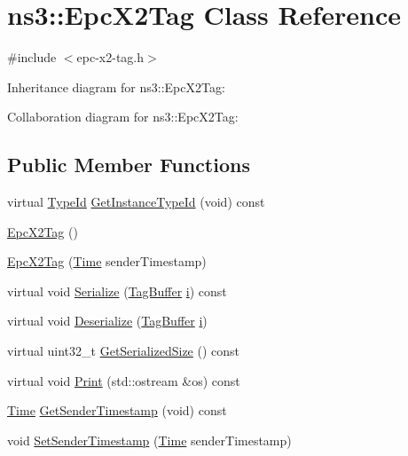 \hypertarget{classns3_1_1EpcX2Tag}{}\section{ns3\+:\+:Epc\+X2\+Tag Class Reference}
\label{classns3_1_1EpcX2Tag}


{\ttfamily \#include $<$epc-\/x2-\/tag.\+h$>$}



Inheritance diagram for ns3\+:\+:Epc\+X2\+Tag\+:


Collaboration diagram for ns3\+:\+:Epc\+X2\+Tag\+:
\subsection*{Public Member Functions}
\begin{DoxyCompactItemize}
\item 
virtual \hyperlink{classns3_1_1TypeId}{Type\+Id} \hyperlink{classns3_1_1EpcX2Tag_a565dcf10e6b20f94b2e047db5b81237e}{Get\+Instance\+Type\+Id} (void) const 
\item 
\hyperlink{classns3_1_1EpcX2Tag_a625c29a61208310c173cdbe99adcfb17}{Epc\+X2\+Tag} ()
\item 
\hyperlink{classns3_1_1EpcX2Tag_a8eee02ebe341d43cf60210257d52a2ba}{Epc\+X2\+Tag} (\hyperlink{classns3_1_1Time}{Time} sender\+Timestamp)
\item 
virtual void \hyperlink{classns3_1_1EpcX2Tag_ab3e9fce832d2bf9e7f72b6bd240d6c27}{Serialize} (\hyperlink{classns3_1_1TagBuffer}{Tag\+Buffer} \hyperlink{lte__uplink__power__control_8m_a6f6ccfcf58b31cb6412107d9d5281426}{i}) const 
\item 
virtual void \hyperlink{classns3_1_1EpcX2Tag_a88b4e8d23280399c487bac59e623f0e2}{Deserialize} (\hyperlink{classns3_1_1TagBuffer}{Tag\+Buffer} \hyperlink{lte__uplink__power__control_8m_a6f6ccfcf58b31cb6412107d9d5281426}{i})
\item 
virtual uint32\+\_\+t \hyperlink{classns3_1_1EpcX2Tag_a467ede849be18755ed62f17b6eee9175}{Get\+Serialized\+Size} () const 
\item 
virtual void \hyperlink{classns3_1_1EpcX2Tag_a87c7319abb9c8ec86443ecba5c4a683c}{Print} (std\+::ostream \&os) const 
\item 
\hyperlink{classns3_1_1Time}{Time} \hyperlink{classns3_1_1EpcX2Tag_a544ddd722ea54a72b95167ead48b558d}{Get\+Sender\+Timestamp} (void) const 
\item 
void \hyperlink{classns3_1_1EpcX2Tag_af92e548a5149d0b7e102ba7b99c502c0}{Set\+Sender\+Timestamp} (\hyperlink{classns3_1_1Time}{Time} sender\+Timestamp)
\end{DoxyCompactItemize}
